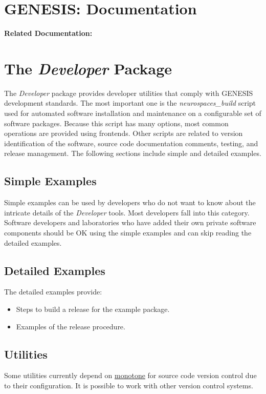 \documentclass[12pt]{article}
\begin{document}
\section*{GENESIS: Documentation}

{\bf Related Documentation:}

\section*{The {\it Developer} Package}

The {\it Developer} package provides developer utilities that comply with GENESIS development standards. The most important one is the {\it
  neurospaces\_build} script used for automated software installation and maintenance on a configurable set of software packages.  Because
this script has many options, most common operations are provided using frontends.  Other scripts are related to version identification of the software, source code documentation comments, testing, and release management. The following sections include simple and detailed examples. 

\subsection*{Simple Examples}
Simple examples can be used by developers who do not want to know about the intricate details of the {\it Developer} tools.  Most developers fall into this category. Software developers and laboratories who have added their own private software components should be OK using the simple examples and can skip reading the detailed examples.

\subsection*{Detailed Examples}
The detailed examples provide:
\begin{itemize}
   \item Steps to build a release for the example {\tt <your-software>} package.
   \item Examples of the release procedure.
\end{itemize}

\subsection*{Utilities}
Some utilities currently depend on \href{http://monotone.ca}{monotone} for source code version control due to their configuration. It is possible to work with other version control systems.
\end{document}
